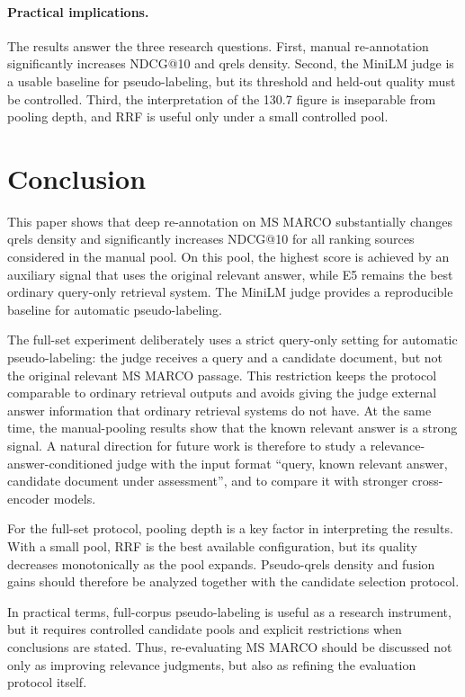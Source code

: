 \documentclass[runningheads,a4paper]{llncs}
\begin{document}
\paragraph{Practical implications.}
The results answer the three research questions. First, manual re-annotation significantly increases NDCG@10 and qrels density. Second, the MiniLM judge is a usable baseline for pseudo-labeling, but its threshold and held-out quality must be controlled. Third, the interpretation of the 130.7 figure is inseparable from pooling depth, and RRF is useful only under a small controlled pool.

\section{Conclusion}

This paper shows that deep re-annotation on MS MARCO substantially changes qrels density and significantly increases NDCG@10 for all ranking sources considered in the manual pool. On this pool, the highest score is achieved by an auxiliary signal that uses the original relevant answer, while E5 remains the best ordinary query-only retrieval system. The MiniLM judge provides a reproducible baseline for automatic pseudo-labeling.

The full-set experiment deliberately uses a strict query-only setting for automatic pseudo-labeling: the judge receives a query and a candidate document, but not the original relevant MS MARCO passage. This restriction keeps the protocol comparable to ordinary retrieval outputs and avoids giving the judge external answer information that ordinary retrieval systems do not have. At the same time, the manual-pooling results show that the known relevant answer is a strong signal. A natural direction for future work is therefore to study a relevance-answer-conditioned judge with the input format ``query, known relevant answer, candidate document under assessment'', and to compare it with stronger cross-encoder models.

For the full-set protocol, pooling depth is a key factor in interpreting the results. With a small pool, RRF is the best available configuration, but its quality decreases monotonically as the pool expands. Pseudo-qrels density and fusion gains should therefore be analyzed together with the candidate selection protocol.

In practical terms, full-corpus pseudo-labeling is useful as a research instrument, but it requires controlled candidate pools and explicit restrictions when conclusions are stated. Thus, re-evaluating MS MARCO should be discussed not only as improving relevance judgments, but also as refining the evaluation protocol itself.
\end{document}
